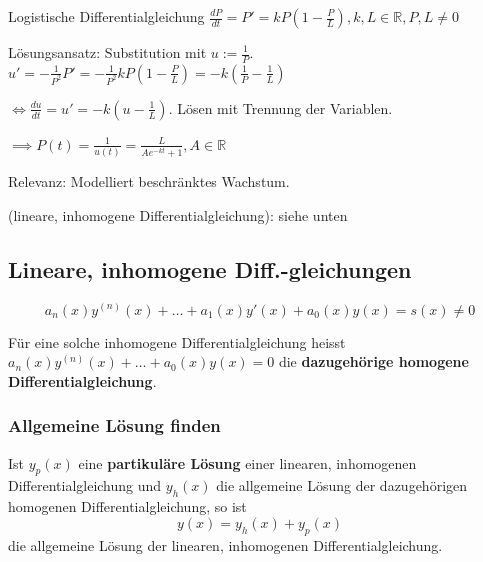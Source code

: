 \begin{exercise}
    Logistische Differentialgleichung $\frac{dP}{dt}=P'=kP(1-\frac{P}{L}), k,L\in \mathbb{R}, P,L\neq0$

    Lösungsansatz: Substitution mit $u:=\frac{1}{P}$.
    $u'=-\frac{1}{P^2}P'=-\frac{1}{P^2}kP(1-\frac{P}{L})=-k(\frac{1}{P}-\frac{1}{L})$

    $\iff \frac{du}{dt}=u'=-k(u-\frac{1}{L})$. Lösen mit Trennung der Variablen.

    $\implies P(t)=\frac{1}{u(t)}=\frac{L}{Ae^{-kt}+1}, A \in \mathbb{R}$

    Relevanz: Modelliert beschränktes Wachstum.
\end{exercise}

 (lineare, inhomogene Differentialgleichung): siehe unten

\subsection{Lineare, inhomogene Diff.-gleichungen}

$$a_n(x)y^{(n)}(x)+\dots+a_1(x)y'(x)+a_0(x)y(x)=s(x)\neq 0$$ 

Für eine solche inhomogene Differentialgleichung heisst $a_n(x)y^{(n)}(x)+\dots+a_0(x)y(x)=0$ die \textbf{dazugehörige homogene Differentialgleichung}.

\subsubsection{Allgemeine Lösung finden}

Ist $y_p(x)$ eine \textbf{partikuläre Lösung} einer linearen, inhomogenen Differentialgleichung und $y_h(x)$ die allgemeine Lösung der dazugehörigen homogenen Differentialgleichung, so ist
$$y(x)=y_h(x)+y_p(x)$$
die allgemeine Lösung der linearen, inhomogenen Differentialgleichung.

